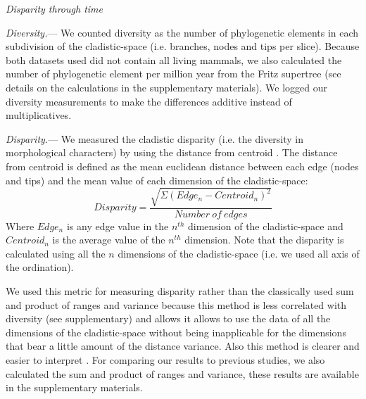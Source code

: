 \documentclass[12pt,letterpaper]{article}
\renewcommand{\subsection}[1]{%
\bigskip
\begin{center}
\begin{large}
\normalfont\itshape #1
\end{large}
\end{center}}
\renewcommand{\subsubsection}[1]{%
\vspace{2ex}
\noindent
\textit{#1.}---}
\begin{document}
\subsection{Disparity through time}
\subsubsection{Diversity}
We counted diversity as the number of phylogenetic elements in each subdivision of the cladistic-space (i.e. branches, nodes and tips per slice). Because both datasets used did not contain all living mammals, we also calculated the number of phylogenetic element per million year from the Fritz supertree \citep{fritzdiversity2013} (see details on the calculations in the supplementary materials). We logged our diversity measurements to make the differences additive instead of multiplicatives.

\subsubsection{Disparity}
We measured the cladistic disparity (i.e. the diversity in morphological characters) by using the distance from centroid \citep{finlay2015morphological}. The distance from centroid is defined as the mean euclidean distance between each edge (nodes and tips) and the mean value of each dimension of the cladistic-space:
\begin{equation}
Disparity=\frac{\sqrt{\Sigma(Edge_{n}-Centroid_{n})^2}}{Number\ of\ edges}
\end{equation}
Where $Edge_{n}$ is any edge value in the $n^{th}$ dimension of the cladistic-space and $Centroid_{n}$ is the average value of the $n^{th}$ dimension. Note that the disparity is calculated using all the $n$ dimensions of the cladistic-space (i.e. we used all axis of the ordination).

We used this metric for measuring disparity rather than the classically used sum and product of ranges and variance \citep[e.g.][]{Wills1994,Foote29111996,Wesley-Hunt2005,Brusatte12092008,ruta2013} %
because this method is less correlated with diversity (see supplementary) and allows it allows to use the data of all the dimensions of the cladistic-space without being inapplicable for the dimensions that bear a little amount of the distance variance. Also this method is clearer and easier to interpret \citep{finlay2015morphological}. For comparing our results to previous studies, we also calculated the sum and product of ranges and variance, these results are available in the supplementary materials.
\end{document}

